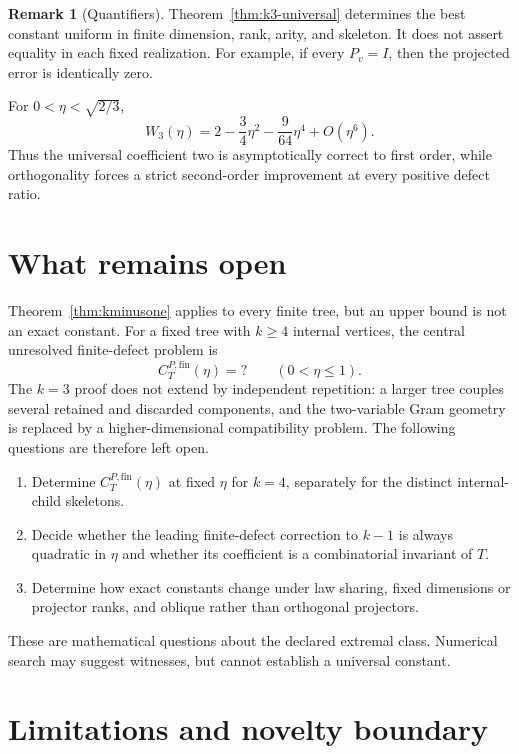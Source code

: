 \documentclass[11pt]{article}
\theoremstyle{definition}
\newtheorem{remark}[theorem]{Remark}
\newcommand{\fin}{\mathrm{fin}}
\begin{document}
\begin{remark}[Quantifiers]
Theorem~\ref{thm:k3-universal} determines the best constant uniform in finite
dimension, rank, arity, and skeleton.  It does not assert equality in each
fixed realization.  For example, if every $P_v=I$, then the projected error is
identically zero.
\end{remark}

For $0<\eta<\sqrt{2/3}$,
\begin{equation}\label{eq:expansion}
 W_3(\eta)=2-\frac34\eta^2-\frac{9}{64}\eta^4+O(\eta^6).
\end{equation}
Thus the universal coefficient two is asymptotically correct to first order,
while orthogonality forces a strict second-order improvement at every positive
defect ratio.

\section{What remains open}

Theorem~\ref{thm:kminusone} applies to every finite tree, but an upper bound is
not an exact constant.  For a fixed tree with $k\ge4$ internal vertices, the
central unresolved finite-defect problem is
\[
 \boxed{C_T^{P,\fin}(\eta)=?\qquad(0<\eta\le1).}
\]
The $k=3$ proof does not extend by independent repetition: a larger tree couples
several retained and discarded components, and the two-variable Gram geometry
is replaced by a higher-dimensional compatibility problem.  The following
questions are therefore left open.

\begin{enumerate}
\item Determine $C_T^{P,\fin}(\eta)$ at fixed $\eta$ for $k=4$, separately for
the distinct internal-child skeletons.
\item Decide whether the leading finite-defect correction to $k-1$ is always
quadratic in $\eta$ and whether its coefficient is a combinatorial invariant of
$T$.
\item Determine how exact constants change under law sharing, fixed dimensions
or projector ranks, and oblique rather than orthogonal projectors.
\end{enumerate}

These are mathematical questions about the declared extremal class.  Numerical
search may suggest witnesses, but cannot establish a universal constant.

\section{Limitations and novelty boundary}
\end{document}
